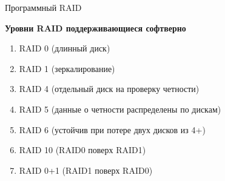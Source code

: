 \begin{frame}{Программный RAID}
  \begin{center}
    \textbf{Уровни RAID поддерживающиеся софтверно}
   \end{center}
   \begin{enumerate}
     \item RAID 0 (длинный диск)
     \pause
     \item RAID 1 (зеркалирование)
     \pause 
     \item RAID 4 (отдельный диск на проверку четности)
     \pause
     \item RAID 5 (данные о четности распределены по дискам)
     \pause
     \item RAID 6 (устойчив при потере двух дисков из 4+)
     \pause
     \item RAID 10 (RAID0 поверх RAID1)
     \pause
     \item RAID 0+1 (RAID1 поверх RAID0)
   \end{enumerate}
\end{frame}

